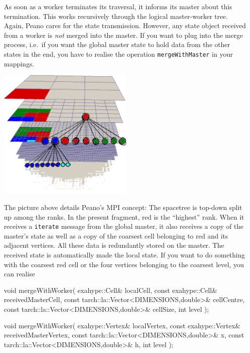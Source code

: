 As soon as a worker terminates its traversal, it informs its master about this
termination.
This works recursively through the logical master-worker tree.
Again, Peano cares for the state transmission. 
However, any state object received from a worker is {\em not} merged into the
master. 
If you want to plug into the merge process, i.e.~if you want the global master
state to hold data from the other states in the end, you have to realise the
operation \texttt{mergeWithMaster} in your mappings.


\begin{center}
  \includegraphics[width=0.5\textwidth]{52_mpi/spacetree-decomposition-top-down.pdf}
\end{center}

\noindent
The picture above details Peano's MPI concept:
The spacetree is top-down split up among the ranks. 
In the present fragment, red is the ``highest'' rank.
When it receives a \texttt{iterate} message from the global master, it also
receives a copy of the master's state as well as a copy of the coarsest cell
belonging to red and its adjacent vertices.
All these data is redundantly stored on the master.
The received state is automatically made the local state.
If you want to do something with the coarsest red cell or the four vertices
belonging to the coarsest level, you can realise 
\begin{code}
void mergeWithWorker(
  exahype::Cell&                               localCell, 
  const exahype::Cell&                         receivedMasterCell,
  const tarch::la::Vector<DIMENSIONS,double>&  cellCentre,
  const tarch::la::Vector<DIMENSIONS,double>&  cellSize,
  int                                          level
);

void mergeWithWorker(
  exahype::Vertex&                             localVertex,
  const exahype::Vertex&                       receivedMasterVertex,
  const tarch::la::Vector<DIMENSIONS,double>&  x,
  const tarch::la::Vector<DIMENSIONS,double>&  h,
  int                                          level
);
\end{code}

